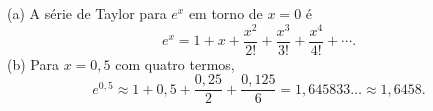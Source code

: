 (a) A série de Taylor para $e^{x}$ em torno de $x=0$ é
\[
e^{x}=1+x+\frac{x^{2}}{2!}+\frac{x^{3}}{3!}+\frac{x^{4}}{4!}+\cdots.
\]
(b) Para $x=0{,}5$ com quatro termos,
\[
e^{0{,}5}\approx1+0{,}5+\frac{0{,}25}{2}+\frac{0{,}125}{6}=1{,}645833\ldots\approx1{,}6458.
\]